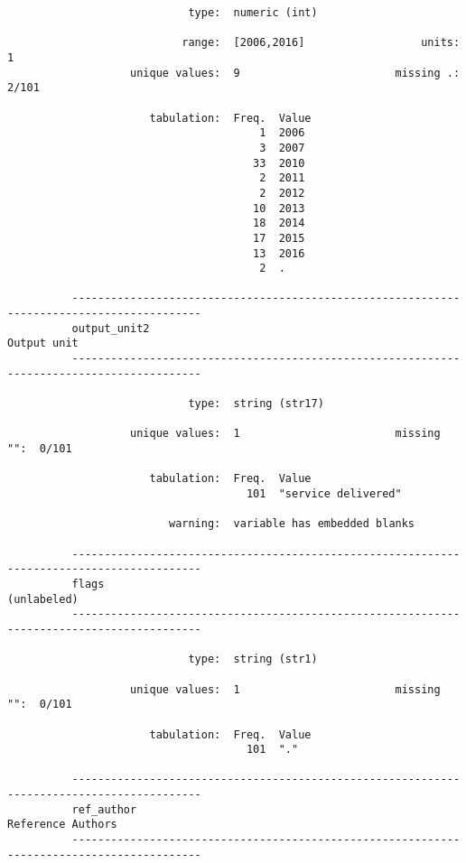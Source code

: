 \documentclass{article}
\begin{document}
\begin{verbatim}
                            type:  numeric (int)
          
                           range:  [2006,2016]                  units:  1
                   unique values:  9                        missing .:  2/101
          
                      tabulation:  Freq.  Value
                                       1  2006
                                       3  2007
                                      33  2010
                                       2  2011
                                       2  2012
                                      10  2013
                                      18  2014
                                      17  2015
                                      13  2016
                                       2  .
          
          ------------------------------------------------------------------------------------------
          output_unit2                                                                   Output unit
          ------------------------------------------------------------------------------------------
          
                            type:  string (str17)
          
                   unique values:  1                        missing "":  0/101
          
                      tabulation:  Freq.  Value
                                     101  "service delivered"
          
                         warning:  variable has embedded blanks
          
          ------------------------------------------------------------------------------------------
          flags                                                                          (unlabeled)
          ------------------------------------------------------------------------------------------
          
                            type:  string (str1)
          
                   unique values:  1                        missing "":  0/101
          
                      tabulation:  Freq.  Value
                                     101  "."
          
          ------------------------------------------------------------------------------------------
          ref_author                                                               Reference Authors
          ------------------------------------------------------------------------------------------
          

\end{verbatim}
\end{document}
